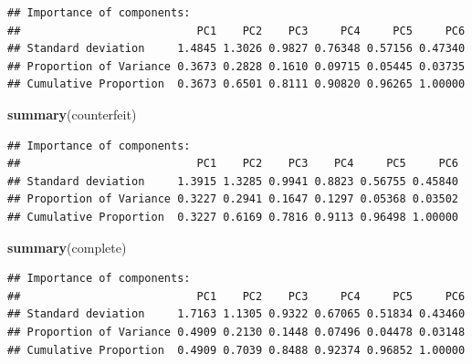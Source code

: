 \documentclass[]{article}
\newenvironment{Shaded}{\begin{snugshade}}{\end{snugshade}}
\newcommand{\KeywordTok}[1]{\textcolor[rgb]{0.13,0.29,0.53}{\textbf{{#1}}}}
\newcommand{\DataTypeTok}[1]{\textcolor[rgb]{0.13,0.29,0.53}{{#1}}}
\newcommand{\DecValTok}[1]{\textcolor[rgb]{0.00,0.00,0.81}{{#1}}}
\newcommand{\StringTok}[1]{\textcolor[rgb]{0.31,0.60,0.02}{{#1}}}
\newcommand{\OtherTok}[1]{\textcolor[rgb]{0.56,0.35,0.01}{{#1}}}
\newcommand{\NormalTok}[1]{{#1}}
\begin{document}
\begin{Shaded}
\end{Shaded}

\begin{verbatim}
## Importance of components:
##                           PC1    PC2    PC3     PC4     PC5     PC6
## Standard deviation     1.4845 1.3026 0.9827 0.76348 0.57156 0.47340
## Proportion of Variance 0.3673 0.2828 0.1610 0.09715 0.05445 0.03735
## Cumulative Proportion  0.3673 0.6501 0.8111 0.90820 0.96265 1.00000
\end{verbatim}

\begin{Shaded}
\begin{Highlighting}[]
\KeywordTok{summary}\NormalTok{(counterfeit)}
\end{Highlighting}
\end{Shaded}

\begin{verbatim}
## Importance of components:
##                           PC1    PC2    PC3    PC4     PC5     PC6
## Standard deviation     1.3915 1.3285 0.9941 0.8823 0.56755 0.45840
## Proportion of Variance 0.3227 0.2941 0.1647 0.1297 0.05368 0.03502
## Cumulative Proportion  0.3227 0.6169 0.7816 0.9113 0.96498 1.00000
\end{verbatim}

\begin{Shaded}
\begin{Highlighting}[]
\KeywordTok{summary}\NormalTok{(complete)}
\end{Highlighting}
\end{Shaded}

\begin{verbatim}
## Importance of components:
##                           PC1    PC2    PC3     PC4     PC5     PC6
## Standard deviation     1.7163 1.1305 0.9322 0.67065 0.51834 0.43460
## Proportion of Variance 0.4909 0.2130 0.1448 0.07496 0.04478 0.03148
## Cumulative Proportion  0.4909 0.7039 0.8488 0.92374 0.96852 1.00000
\end{verbatim}
\end{document}
